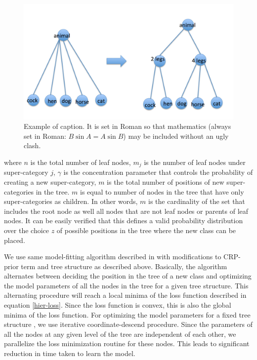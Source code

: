\documentclass[10pt,twocolumn,letterpaper]{article}
\begin{document}
  \begin{figure}[t]
  	\begin{center}
  		\includegraphics[width=0.8\linewidth]{split}
  	\end{center}
  	\caption{Example of caption.  It is set in Roman so that mathematics
  		(always set in Roman: $B \sin A = A \sin B$) may be included without an
  		ugly clash.}
  	\label{fig:long}
  	\label{fig:onecol}
  \end{figure}
where $n$ is the total number of leaf nodes, $m_{j}$
is the number of leaf nodes under super-category $j$,
$\gamma$ is the concentration parameter that controls the probability of creating a new super-category,
$m$ is the total number of positions of new super-categories in the tree. $m$ is equal to number of nodes
in the tree that have only super-categories as children. In other words, $m$ is the cardinality of the set that 
includes the root node as well all nodes that are not leaf nodes or parents of leaf nodes. It can be easily verified that 
this defines a valid probability distribution over the choice $z$ of possible positions in the tree where the new class can be placed.

We use same model-fitting algorithm described in \cite{ruslan} with modifications to CRP-prior term and tree structure as described above.
Basically, the algorithm alternates between deciding the position in the tree of a new class and optimizing the model parameters of all the nodes
in the tree for a given tree structure.  This alternating procedure will reach a local minima of the loss function 
described in equation \ref{hier-loss}. Since the loss function is convex, this is also the global minima of the loss function. 
For optimizing the model parameters for a fixed tree structure , we use iterative coordinate-descend procedure.
Since the parameters of all the nodes at any given level of the tree are independent of each other, we parallelize the loss minimization 
routine for these nodes. This leads to significant reduction in time taken to learn the model.
\end{document}
